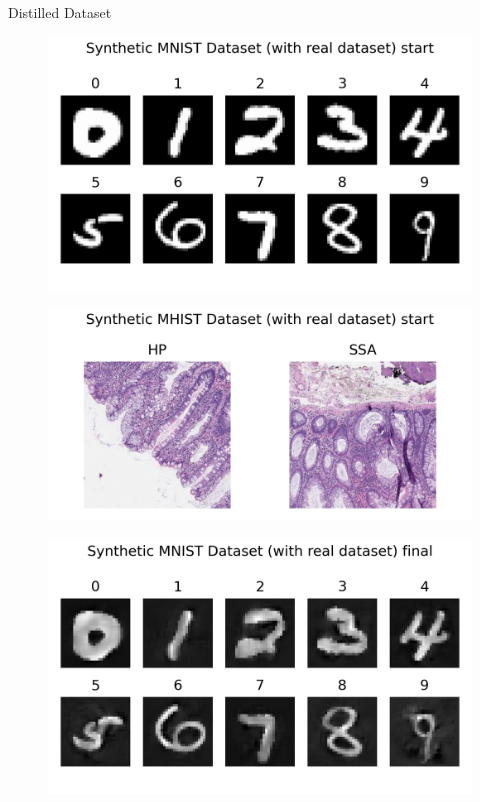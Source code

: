 \documentclass[final]{beamer}
\newlength{\colwidth}
\begin{document}
\begin{columns}
\begin{column}{\colwidth}
		\begin{block}{Distilled Dataset}
			\begin{figure}[H]
				\centering
				\begin{minipage}{0.43\textwidth}
					\centering
					\includegraphics[width=\textwidth]{../report/figures/mnist_real_sample.png}
					\label{fig:mnist-before}
				\end{minipage}
				\hfill
				\begin{minipage}{0.43\textwidth}
					\centering
					\includegraphics[width=\textwidth]{../report/figures/mhist_real_sample.png}
					\label{fig:mnist-after}
				\end{minipage}
				\label{fig:mnist-comparison}
			\end{figure}
			\begin{figure}[H]
				\centering
				\begin{minipage}{0.43\textwidth}
					\centering
					\includegraphics[width=\textwidth]{../report/figures/mnist_real_syn.png}

\end{minipage}
\end{figure}
\end{block}
\end{column}
\end{columns}
\end{document}
